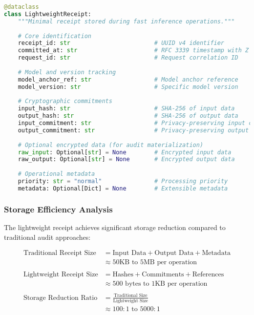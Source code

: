 \documentclass[12pt,a4paper]{article}
\begin{document}
\begin{lstlisting}[language=Python, caption=Lightweight Receipt Structure]
@dataclass
class LightweightReceipt:
    """Minimal receipt stored during fast inference operations."""
    
    # Core identification
    receipt_id: str                        # UUID v4 identifier
    committed_at: str                      # RFC 3339 timestamp with Z
    request_id: str                        # Request correlation ID
    
    # Model and version tracking
    model_anchor_ref: str                  # Model anchor reference
    model_version: str                     # Specific model version
    
    # Cryptographic commitments
    input_hash: str                        # SHA-256 of input data
    output_hash: str                       # SHA-256 of output data
    input_commitment: str                  # Privacy-preserving input commitment
    output_commitment: str                 # Privacy-preserving output commitment
    
    # Optional encrypted data (for audit materialization)
    raw_input: Optional[str] = None        # Encrypted input data
    raw_output: Optional[str] = None       # Encrypted output data
    
    # Operational metadata
    priority: str = "normal"               # Processing priority
    metadata: Optional[Dict] = None        # Extensible metadata
\end{lstlisting}

\subsubsection{Storage Efficiency Analysis}

The lightweight receipt achieves significant storage reduction compared to traditional audit approaches:

\begin{align}
\text{Traditional Receipt Size} &= \text{Input Data} + \text{Output Data} + \text{Metadata} \\
&\approx 50\text{KB to 5MB per operation} \\
\\
\text{Lightweight Receipt Size} &= \text{Hashes} + \text{Commitments} + \text{References} \\
&\approx 500\text{ bytes to 1KB per operation} \\
\\
\text{Storage Reduction Ratio} &= \frac{\text{Traditional Size}}{\text{Lightweight Size}} \\
&\approx 100:1 \text{ to } 5000:1
\end{align}
\end{document}
